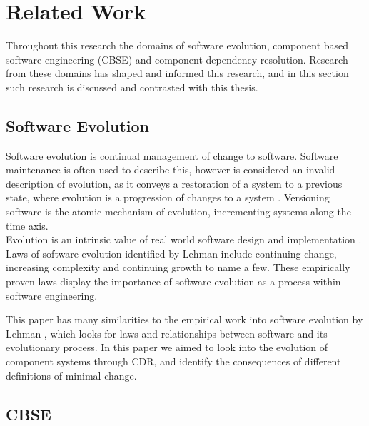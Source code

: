 



\section{Related Work}
Throughout this research the domains of software evolution, component based software engineering (CBSE) and component dependency resolution.
Research from these domains has shaped and informed this research, and in this section such research is discussed and contrasted with this thesis.

\subsection{Software Evolution}
Software evolution is continual management of change to software. 
Software maintenance is often used to describe this,
however is considered an invalid description of evolution, as it conveys a
restoration of a system to a previous state, where evolution is a progression
of changes to a system \cite{lehman_software_2006}. Versioning software is the atomic mechanism of evolution, 
incrementing systems along the time axis.\\ 
Evolution is an intrinsic value of real world software
design and implementation \cite{lehman_programs_1980}. Laws of software
evolution identified by Lehman include continuing change, increasing complexity and
continuing growth \cite{lehman_rules_2001} to name a few. These empirically proven laws
display the importance of software evolution as a process within software
engineering.

This paper has many similarities to the empirical work into software evolution by Lehman \cite{lehman1980},
which looks for laws and relationships between software and its evolutionary process.
In this paper we aimed to look into the evolution of component systems through CDR,
and identify the consequences of different definitions of minimal change. 


\subsection{CBSE}

